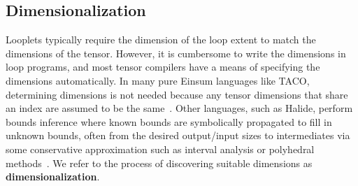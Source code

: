 \subsection{Dimensionalization}
    Looplets typically require the dimension of the loop extent to match the dimensions of the tensor. 
    However, it is cumbersome to write the dimensions
    in loop programs, and most tensor compilers have a means of specifying the dimensions automatically.
    In many pure Einsum languages like TACO, determining dimensions
    is not needed because any tensor dimensions that share an index are assumed to be the same~\cite{kjolstad_tensor_2017}.
    Other languages, such as Halide, perform bounds inference where
    known bounds are symbolically propagated to fill in unknown bounds, often from the desired output/input sizes to intermediates via some conservative approximation such as interval analysis or polyhedral methods~\cite{ragan-kelley_halide_2013, grosser2012polly}.
    We refer to the process of discovering suitable
    dimensions as \textbf{dimensionalization}. 

